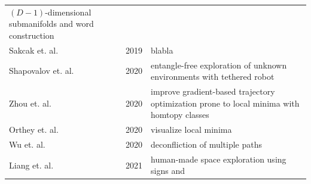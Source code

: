\documentclass[11pt,twocolumn]{article}
\begin{document}
\begin{table}
\begin{tabular}{l c p{8cm}}
                      \((D - 1)\)-dimensional
                      submanifolds and word
                      construction \\
    Sakcak et. al. \cite{sakcakHomotopyAwareKinodynamic2019} & 2019 &
                                                                      blabla
    \\
    Shapovalov
    et. al. \cite{shapovalovExplorationUnknownEnvironments2020} & 2020
               & entangle-free exploration
                 of unknown environments
                 with tethered robot \\
    Zhou et. al. \cite{zhouRobustRealtimeUAV2020} & 2020 & improve
                                                           gradient-based
                                                           trajectory
                                                           optimization
                                                           prone to
                                                           local
                                                           minima with
                                                           homtopy
                                                           classes \\
    Orthey et. al. \cite{ortheyMotionPlanningExplorer2020} & 2020 &
                                                                    visualize
                                                                    local
                                                                    minima \\
    Wu et. al. \cite{wuMultiRobotPathDeconfliction2020} & 2020 &
                                                                 deconfliction
                                                                 of
                                                                 multiple
                                                                 paths
    \\
    Liang et. al. \cite{liangHomotopyDrivenExplorationHumanmade2021} &
                                                                       2021 &
                                                                              human-made
                                                                              space
                                                                              exploration
                                                                              using
                                                                              signs
                                                                              and

\end{tabular}
\end{table}
\end{document}
